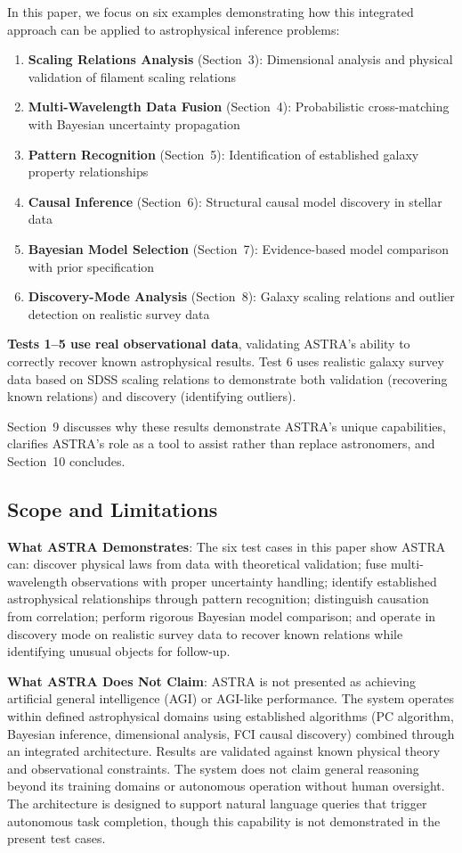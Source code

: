 \documentclass[usenatbib]{rasti}
\begin{document}
In this paper, we focus on six examples demonstrating how this integrated approach can be applied to astrophysical inference problems:
\begin{enumerate}
\item \textbf{Scaling Relations Analysis} (Section~3): Dimensional analysis and physical validation of filament scaling relations
\item \textbf{Multi-Wavelength Data Fusion} (Section~4): Probabilistic cross-matching with Bayesian uncertainty propagation
\item \textbf{Pattern Recognition} (Section~5): Identification of established galaxy property relationships
\item \textbf{Causal Inference} (Section~6): Structural causal model discovery in stellar data
\item \textbf{Bayesian Model Selection} (Section~7): Evidence-based model comparison with prior specification
\item \textbf{Discovery-Mode Analysis} (Section~8): Galaxy scaling relations and outlier detection on realistic survey data
\end{enumerate}

\textbf{Tests 1--5 use real observational data}, validating ASTRA's ability to correctly recover known astrophysical results. Test 6 uses realistic galaxy survey data based on SDSS scaling relations to demonstrate both validation (recovering known relations) and discovery (identifying outliers).

Section~9 discusses why these results demonstrate ASTRA's unique capabilities, clarifies ASTRA's role as a tool to assist rather than replace astronomers, and Section~10 concludes.

\subsection{Scope and Limitations}

\textbf{What ASTRA Demonstrates}: The six test cases in this paper show ASTRA can: discover physical laws from data with theoretical validation; fuse multi-wavelength observations with proper uncertainty handling; identify established astrophysical relationships through pattern recognition; distinguish causation from correlation; perform rigorous Bayesian model comparison; and operate in discovery mode on realistic survey data to recover known relations while identifying unusual objects for follow-up.

\textbf{What ASTRA Does Not Claim}: ASTRA is not presented as achieving artificial general intelligence (AGI) or AGI-like performance. The system operates within defined astrophysical domains using established algorithms (PC algorithm, Bayesian inference, dimensional analysis, FCI causal discovery) combined through an integrated architecture. Results are validated against known physical theory and observational constraints. The system does not claim general reasoning beyond its training domains or autonomous operation without human oversight. The architecture is designed to support natural language queries that trigger autonomous task completion, though this capability is not demonstrated in the present test cases.
\end{document}
